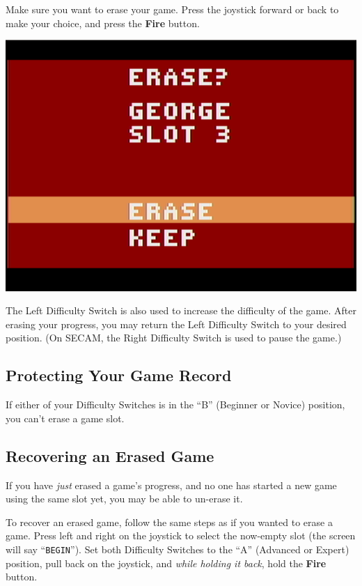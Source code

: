 \documentclass[10pt,twocolumn,openany,article]{memoir}
\begin{document}
\else

Make sure  you want to  erase your game.  Press the joystick  forward or
back to make your choice, and press the \textbf{Fire} button.

\begin{center}
  \includegraphics[width=\columnwidth]{../Manual/ConfirmEraseNTSC.png}
\end{center}

\fi

The Left  Difficulty Switch is also  used to increase the  difficulty of
the  game.  After  erasing  your  progress,  you  may  return  the  Left
Difficulty  Switch  to  your  desired position.  (On  SECAM,  the  Right
Difficulty Switch is used to pause the game.)

\subsection{Protecting Your Game Record}

If  either of  your Difficulty  Switches is  in the  ``B'' (Beginner  or
Novice) position, you can't erase a game slot.

\ifdefined\DEMO\else

\subsection{Recovering an Erased Game}

If you have \emph{just} erased a game's progress, and no one has started
a new game using the same slot yet, you may be able to un-erase it.

To recover  an erased game,  follow the same steps  as if you  wanted to
erase  a game.  Press  left and  right  on the  joystick  to select  the
now-empty  slot  (the  screen  will say  ``\texttt{BEGIN}'').  Set  both
Difficulty Switches  to the  ``A'' (Advanced  or Expert)  position, pull
back  on  the joystick,  and  \emph{while  holding  it back},  hold  the
\textbf{Fire} button.
\end{document}

